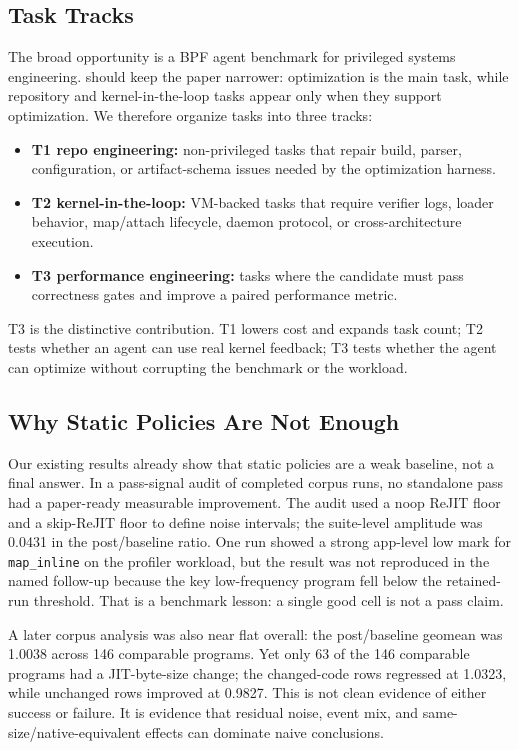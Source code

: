 \subsection{Task Tracks}

The broad opportunity is a BPF agent benchmark for privileged systems engineering. \sys should keep the paper narrower: optimization is the main task, while repository and kernel-in-the-loop tasks appear only when they support optimization. We therefore organize tasks into three tracks:

\begin{itemize}
  \item \textbf{T1 repo engineering:} non-privileged tasks that repair build, parser, configuration, or artifact-schema issues needed by the optimization harness.
  \item \textbf{T2 kernel-in-the-loop:} VM-backed tasks that require verifier logs, loader behavior, map/attach lifecycle, daemon protocol, or cross-architecture execution.
  \item \textbf{T3 performance engineering:} tasks where the candidate must pass correctness gates and improve a paired performance metric.
\end{itemize}

T3 is the distinctive \sys contribution. T1 lowers cost and expands task count; T2 tests whether an agent can use real kernel feedback; T3 tests whether the agent can optimize without corrupting the benchmark or the workload.

\subsection{Why Static Policies Are Not Enough}

Our existing results already show that static policies are a weak baseline, not a final answer. In a pass-signal audit of completed corpus runs, no standalone pass had a paper-ready measurable improvement. The audit used a noop ReJIT floor and a skip-ReJIT floor to define noise intervals; the suite-level amplitude was 0.0431 in the post/baseline ratio. One run showed a strong app-level low mark for \texttt{map\_inline} on the profiler workload, but the result was not reproduced in the named follow-up because the key low-frequency program fell below the retained-run threshold. That is a benchmark lesson: a single good cell is not a pass claim.

A later corpus analysis was also near flat overall: the post/baseline geomean was 1.0038 across 146 comparable programs. Yet only 63 of the 146 comparable programs had a JIT-byte-size change; the changed-code rows regressed at 1.0323, while unchanged rows improved at 0.9827. This is not clean evidence of either success or failure. It is evidence that residual noise, event mix, and same-size/native-equivalent effects can dominate naive conclusions.

